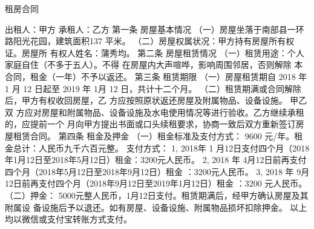 \documentclass[12pt,a4paper]{article}
\begin{document}
\begin{center}
  \begin{Huge}
    租房合同
  \end{Huge}
\end{center}
出租人：甲方
\newline{}
承租人：乙方
\newline{}
第一条\enspace{} 房屋基本情况
\newline{}
（一）房屋坐落于南部县一环路阳光花园，建筑面积137 平米。
\newline{}
（二）房屋权属状况：甲方持有房屋所有权证。房屋所 有权人姓名：蒲秀均。
\newline{}
\newline{}
第二条\enspace{} 房屋租赁情况
\newline{}
（一）租赁用途：个人家庭自住（不多于五人）。不得 在房屋内大声喧哗，影响周围邻居，否则解除
本合同，租金（一年）不予以返还。
\newline{}
\newline{}
第三条\enspace{} 租赁期限
\newline{}
（一）房屋租赁期自 2018 年 1 月 12 日起至 2019 年 1月 12 日，共计十二个月。
\newline{}
（二）租赁期满或合同解除后，甲方有权收回房屋，乙 方应按照原状返还房屋及附属物品、设备设施。
甲乙双 方应对房屋和附属物品、设备设施及水电使用情况等进行验收。乙方继续承租的，应提前一个
月向甲方提出书面或口头续租要求，协商一致后双方重新签订房屋租赁合同。
\newline{}
\newline{}
第四条\enspace{} 租金及押金
\newline{}
（一）租金标准及支付方式：
\newline{}
9600 元/年。租金总计：人民币九千六百元整。
\newline{}
支付方式：
\newline{}
1, 2018年 1 月12日支付四个月（2018年1月12日至2018年5月12日）租金：3200元人民币。
\newline{}
2, 2018 年 4月12日前再支付四个月（2018年5月12日至2018年9月12日）租金 ：3200元人民币。
\newline{}
3, 2018 年 9月12日前再支付四个月（2018年9月12日至2019年1月12日）租金 ：3200 元人民币。
\newline{}
（二）押金：
\newline{}
5000元整人民币，1月12日支付。租赁期满后，经甲方确认房屋及其附属设
备设施后予以退还。如有房屋、设备设施、附属物品损坏扣除押金。
以上均以微信或支付宝转账方式支付。
\newline{}
\newline{}
\end{document}
